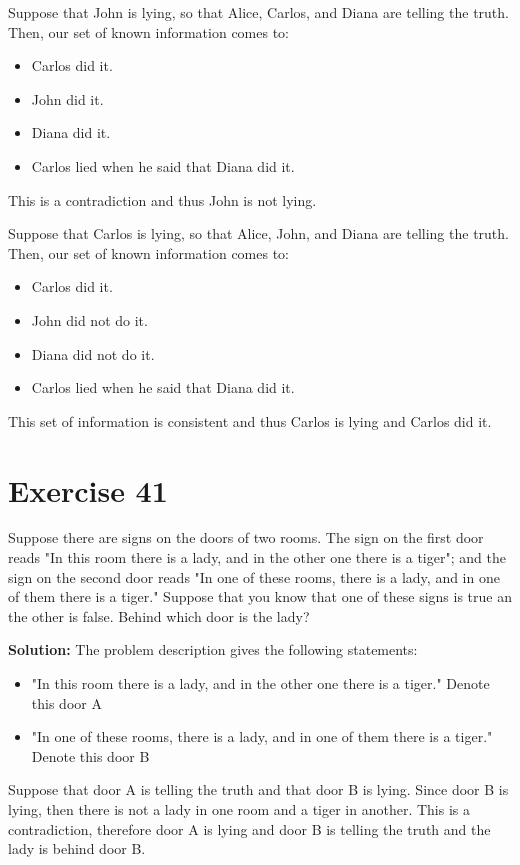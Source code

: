 \documentclass{Axon}
\begin{document}
\begin{enumerate}
    Suppose that John is lying, so that Alice, Carlos, and Diana are telling the truth. Then, our set of known information comes to:
    \begin{itemize}
        \item Carlos did it.
        \item John did it.
        \item Diana did it.
        \item Carlos lied when he said that Diana did it.
    \end{itemize}
    This is a contradiction and thus John is not lying.

    Suppose that Carlos is lying, so that Alice, John, and Diana are telling the truth. Then, our set of known information comes to:
    \begin{itemize}
        \item Carlos did it.
        \item John did not do it.
        \item Diana did not do it.
        \item Carlos lied when he said that Diana did it.
    \end{itemize}
    This set of information is consistent and thus Carlos is lying and Carlos did it.
\end{enumerate}

\section*{Exercise 41}
Suppose there are signs on the doors of two rooms. The sign on the first door reads "In this room there is a lady, and in the other one there is a tiger"; and the sign on the second door reads "In one of these rooms, there is a lady, and in one of them there is a tiger." Suppose that you know that one of these signs is true an the other is false. Behind which door is the lady?

\noindent
\textbf{Solution:}
The problem description gives the following statements:
\begin{itemize}
    \item "In this room there is a lady, and in the other one there is a tiger." Denote this door A
    \item "In one of these rooms, there is a lady, and in one of them there is a tiger." Denote this door B
\end{itemize}

Suppose that door A is telling the truth and that door B is lying. Since door B is lying, then there is not a lady in one room and a tiger in another. This is a contradiction, therefore door A is lying and door B is telling the truth and the lady is behind door B.
\end{document}
